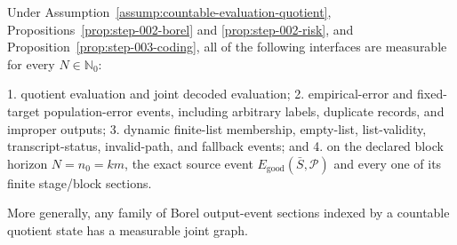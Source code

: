 \begin{proposition}\label{prop:step-003-events}
Under Assumption~\ref{assump:countable-evaluation-quotient}, 
Propositions~\ref{prop:step-002-borel} and
\ref{prop:step-002-risk}, and
Proposition~\ref{prop:step-003-coding}, all of the following interfaces are
measurable for every \(N\in\mathbb N_0\):

1. quotient evaluation and joint decoded evaluation;
2. empirical-error and fixed-target population-error events, including
   arbitrary labels, duplicate records, and improper outputs;
3. dynamic finite-list membership, empty-list, list-validity,
   transcript-status, invalid-path, and fallback events; and
4. on the declared block horizon \(N=n_0=km\), the exact source event
   \(E_{\mathrm{good}}(\bar S,\mathcal P)\) and every one of its finite
   stage/block sections.

More generally, any family of Borel output-event sections indexed by a
countable quotient state has a measurable joint graph.


\end{proposition}

